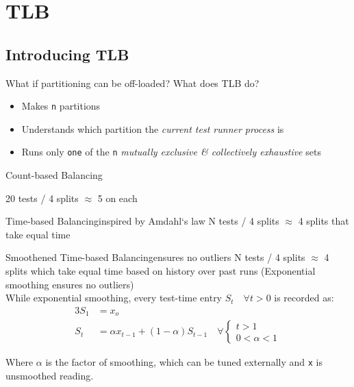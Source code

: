 \documentclass{beamer}
\begin{document}
\section{TLB}

\subsection{Introducing TLB}

\begin{frame}{What if partitioning can be off-loaded?}
  What does TLB do?
  \begin{itemize}
  \item Makes \texttt{n} partitions
    \pause
  \item Understands which partition the \emph{current test runner process} is
    \pause
  \item Runs only \texttt{one} of the \texttt{n} \emph{mutually exclusive \& collectively exhaustive} sets
  \end{itemize}
\end{frame}


\begin{frame}{Count-based Balancing}
  \begin{centering}
    20 tests / 4 splits $\approx$ 5 on each
  \end{centering}
\end{frame}

\begin{frame}{Time-based Balancing}{inspired by Amdahl`s law}
  N tests / 4 splits $\approx$ 4 splits that take equal time
\end{frame}

\begin{frame}{Smoothened Time-based Balancing}{ensures no outliers}
  N tests / 4 splits $\approx$ 4 splits which take equal time based on history over past runs (Exponential smoothing ensures no outliers)\\
  While exponential smoothing, every test-time entry $ S_t \quad \forall t > 0 $ is recorded as:\\
  \begin{alignat}{3}
    S_1 & = x_o\\
    S_t & = \alpha x_{t-1} + (1 - \alpha)S_{t-1} \quad
    \forall 
    \begin{cases}
      t > 1\\ 
      0 < \alpha < 1
    \end{cases}
  \end{alignat}

  Where $\alpha$ is the factor of smoothing, which can be tuned externally and \texttt{x} is unsmoothed reading.
\end{frame}
\end{document}
